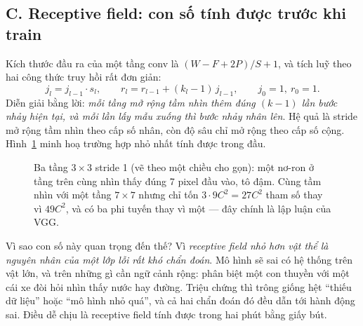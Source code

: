 \documentclass[../../deep_learning.tex]{subfiles}
\begin{document}
\subsection{C. Receptive field: con số tính được trước khi train}

Kích thước đầu ra của một tầng conv là \((W - F + 2P)/S + 1\), và  tích luỹ theo hai công thức truy hồi rất đơn giản:
\[
j_l = j_{l-1}\cdot s_l, \qquad r_l = r_{l-1} + (k_l - 1)\, j_{l-1}, \qquad j_0 = 1,\ r_0 = 1 .
\]
Diễn giải bằng lời: \emph{mỗi tầng mở rộng tầm nhìn thêm đúng \((k-1)\) lần bước nhảy hiện tại, và mỗi lần lấy mẫu xuống thì bước nhảy nhân lên}. Hệ quả là stride mở rộng tầm nhìn theo cấp số nhân, còn độ sâu chỉ mở rộng theo cấp số cộng. Hình~\ref{fig:rf} minh hoạ trường hợp nhỏ nhất tính được trong đầu.

\begin{figure}[H]\centering
{}
\caption{Ba tầng \(3\times3\) stride 1 (vẽ theo một chiều cho gọn): một nơ-ron ở tầng trên cùng nhìn thấy đúng 7 pixel đầu vào, tô đậm. Cùng tầm nhìn với một tầng \(7\times7\) nhưng chỉ tốn \(3\cdot 9C^2 = 27C^2\) tham số thay vì \(49C^2\), và có ba phi tuyến thay vì một --- đây chính là lập luận của VGG.}
\label{fig:rf}
\end{figure}

Vì sao con số này quan trọng đến thế? Vì \emph{receptive field nhỏ hơn vật thể là nguyên nhân của một lớp lỗi rất khó chẩn đoán}. Mô hình sẽ sai có hệ thống trên vật lớn, và trên những gì cần ngữ cảnh rộng: phân biệt một con thuyền với một cái xe đòi hỏi nhìn thấy nước hay đường. Triệu chứng thì trông giống hệt ``thiếu dữ liệu'' hoặc ``mô hình nhỏ quá'', và cả hai chẩn đoán đó đều dẫn tới hành động sai.
 Điều dễ chịu là receptive field tính được trong hai phút bằng giấy bút.
\end{document}
